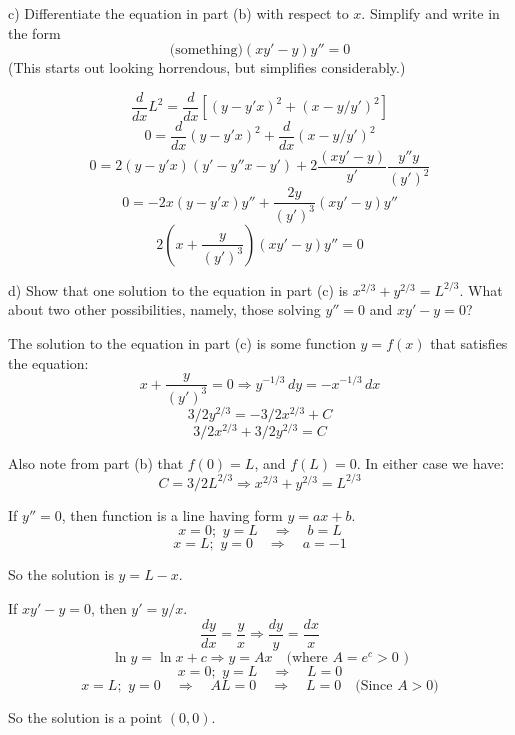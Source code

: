 \documentclass{article}
\begin{document}
\begin{tcolorbox}
    c) Differentiate the equation in part (b) with respect to $x$. Simplify and write in the form
    \[ \text{(something)}(xy' - y)y'' = 0 \]
    (This starts out looking horrendous, but simplifies considerably.)
\end{tcolorbox}
\[ \frac{d}{dx}L^2 = \frac{d}{dx} \left[ (y - y'x)^2 + (x - y/y')^2 \right] \]
\[ 0 = \frac{d}{dx}(y - y'x)^2 + \frac{d}{dx}(x - y/y')^2 \]
\[ 0 = 2(y-y'x)(y' - y''x - y') + 2\frac{(xy'-y)}{y'}\frac{y''y}{(y')^2} \]
\[ 0 = -2x(y - y'x)y'' + \frac{2y}{(y')^3}(xy'-y)y'' \]
\[ 2\left(x + \frac{y}{(y')^3}\right)(xy'-y)y'' = 0 \]

\begin{tcolorbox}
    d) Show that one solution to the equation in part (c) is $x^{2/3} + y^{2/3} = L^{2/3}$. What about two other possibilities, namely, those solving $y'' = 0$ and $xy' - y = 0$?
\end{tcolorbox}
The solution to the equation in part (c) is some function $y = f(x)$ that satisfies the equation:
\[ x + \frac{y}{(y')^3} = 0 \Rightarrow y^{-1/3} \, dy = -x^{-1/3} \, dx \]
\[ 3/2y^{2/3} = -3/2x^{2/3} + C \]
\[ 3/2x^{2/3} + 3/2y^{2/3} =  C \]
\par Also note from part (b) that $f(0) = L$, and $f(L) = 0$. In either case we have:
\[ C = 3/2L^{2/3} \Rightarrow x^{2/3} + y^{2/3} = L^{2/3} \]
\par If $y'' = 0$, then function is a line having form $y = ax + b$.
\[ x = 0;\,\,y = L \quad \Rightarrow \quad   b = L\]
\[ x = L;\,\,y = 0 \quad \Rightarrow \quad  a = -1\]
\par So the solution is $y = L - x$.

\par If $xy' - y = 0$, then $y' = y/x$.
\[ \frac{dy}{dx} = \frac{y}{x} \Rightarrow \frac{dy}{y} = \frac{dx}{x} \]
\[ \ln{y} = \ln{x} + c \Rightarrow y = Ax \quad \text{(where $A = e^c > 0$ )} \]
\[ x = 0; \,\, y = L \quad \Rightarrow \quad L = 0 \]
\[ x = L; \,\, y = 0 \quad \Rightarrow \quad  AL = 0 \quad \Rightarrow \quad L = 0 \quad \text{(Since $A > 0$)}\]
\par So the solution is a point $(0, 0)$. 
\end{document}
